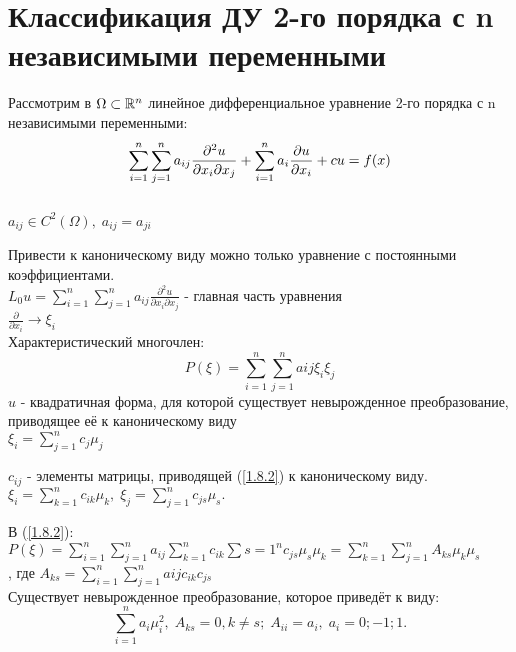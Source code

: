 \documentclass[../main.tex]{subfiles}
\begin{document}
\section{Классификация ДУ 2-го порядка с n независимыми переменными}
\par Рассмотрим в $\Omega \subset \mathbb{R}^n $ линейное дифференциальное уравнение 2-го порядка с n независимыми переменными: \\
\begin{equation}\label{1.8.1}
\sum_{i=1}^n\sum_{j=1}^n a_{ij}\frac{\partial^2u}{\partial x_i \partial x_j} + \sum_{i=1}^n a_i \frac{\partial u}{\partial x_i} + cu = f(x) \end{equation} \\
$a_{ij} \in C^2(\Omega), \; a_{ij} = a_{ji} $ \\
\par Привести к каноническому виду можно только уравнение с постоянными коэффициентами. \\
$L_0u = \sum_{i=1}^n \sum_{j=1}^n a_{ij} \frac{\partial^2u}{\partial x_i \partial x_j} $ - главная часть уравнения \\
$\frac{\partial}{\partial x_i} \rightarrow \xi_i$ \\
Характеристический многочлен: \\
\begin{equation}\label{1.8.2}
P(\xi) = \sum_{i=1}^n \sum_{j=1}^n a{ij}\xi_i\xi_j \end{equation} $u$ - квадратичная форма, для которой существует невырожденное преобразование, приводящее её к каноническому виду \\
$\xi_i = \sum_{j=1}^n c_j \mu_j $ \\
\par $c_{ij}$ - элементы матрицы, приводящей (\ref{1.8.2}) к каноническому виду. \\
$\xi_i = \sum_{k=1}^n c_{ik}\mu_k , \; \xi_j = \sum_{j=1}^n c_{js}\mu_s . $ \\
\par В (\ref{1.8.2}): \\
$P(\xi) = \sum_{i=1}^n \sum_{j=1}^n a_{ij} \sum_{k=1}^n c_{ik} \sum{s=1}^n c_{js}\mu_s\mu_k = \sum_{k=1}^n\sum_{j=1}^n A_{ks}\mu_k\mu_s$ \\
, где $A_{ks} = \sum_{i=1}^n\sum_{j=1}^n a{ij}c_{ik}c_{js} $ \\
Существует невырожденное преобразование, которое приведёт к виду: 
\begin{equation}\label{1.8.3}
\sum_{i=1}^n a_i\mu_i^2, \; A_{ks}=0, k \neq s; \; A_{ii} = a_i, \; a_i = 0;-1;1. \end{equation} \\
\end{document}
